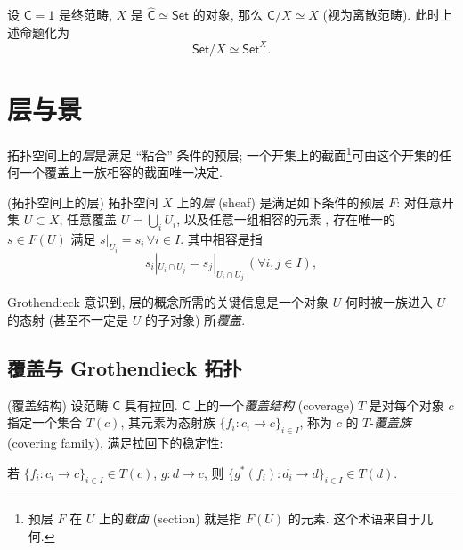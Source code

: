 \begin{example}
    {}
    设 $\mathsf C = \mathsf 1$ 是终范畴,
    $X$ 是 $\widehat {\mathsf C} \simeq \mathsf {Set}$ 的对象,
    那么 $\mathsf C/X \simeq X$ (视为离散范畴).
    此时上述命题化为
    $$
    \mathsf {Set}/X \simeq \mathsf {Set}^X.
    $$
\end{example}


\section{层与景}

拓扑空间上的\emph{层}是满足 ``粘合'' 条件的预层; 一个开集上的截面\footnote{预层 $F$ 在 $U$ 上的\emph{截面} (section) 就是指 $F(U)$ 的元素. 这个术语来自于几何.}可由这个开集的任何一个覆盖上一族相容的截面唯一决定.

\begin{definition}
    {(拓扑空间上的层)}
    拓扑空间 $X$ 上的\emph{层} (sheaf) 是满足如下条件的预层 $F$:
    对任意开集 $U\subset X$, 任意覆盖 $U = \bigcup_i U_i$,
    以及任意一组相容的元素 ,
    存在唯一的 $s\in F(U)$
    满足 $s|_{U_i} = s_i\,\forall i\in I$.
    其中相容是指
    \begin{equation}
        s_i|_{U_i\cap U_j} = s_j|_{U_i\cap U_j}\,(\forall i,j \in I),
        \label{sheaf-condition}
    \end{equation}
\end{definition}

Grothendieck 意识到, 层的概念所需的关键信息是一个对象 $U$ 何时被一族进入 $U$ 的态射 (甚至不一定是 $U$ 的子对象) 所\emph{覆盖}.

\subsection{覆盖与 Grothendieck 拓扑}
\begin{definition}{(覆盖结构)}
    设范畴 $\mathsf C$ 具有拉回.
    $\mathsf C$ 上的一个\emph{覆盖结构} (coverage) $T$ 是对每个对象 $c$ 指定一个集合 $T(c)$, 其元素为态射族 $\{f_i \colon c_i \to c\}_{i\in I}$, 称为 $c$ 的 $T$-\emph{覆盖族} (covering family), 满足拉回下的稳定性:
    \begin{center}
    	若 $\{f_i \colon c_i \to c\}_{i\in I}\in T(c)$, $g \colon d \to c$,
    	则 $\{g^*(f_i) \colon d_i \to d\}_{i\in I}\in T(d)$.
    \end{center}
    
    
\end{definition}

